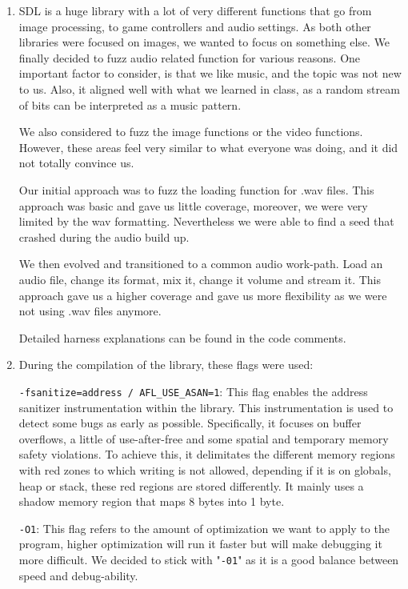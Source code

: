 \documentclass[letterpaper,twocolumn,10pt]{article}
\begin{document}
\begin{enumerate}
    \item SDL is a huge library with a lot of very different functions that go from image processing, to game controllers and audio settings. As both other libraries were focused on images, we wanted to focus on something else. We finally decided to fuzz audio related function for various reasons.
    One important factor to consider, is that we like music, and the topic was not new to us. Also, it aligned well with what we learned in class, as a random stream of bits can be interpreted as a music pattern. 

    We also considered to fuzz the image functions or the video functions. However, these areas feel very similar to what everyone was doing, and it did not totally convince us. 

    Our initial approach was to fuzz the loading function for .wav files. This approach was basic and gave us little coverage, moreover, we were very limited by the wav formatting. Nevertheless we were able to find a seed that crashed during the audio build up. 

    We then evolved and transitioned to a common audio work-path. Load an audio file, change its format, mix it, change it volume and stream it. This approach gave us a higher coverage and gave us more flexibility as we were not using .wav files anymore.

    Detailed harness explanations can be found in the code comments.

    \item During the compilation of the library, these flags were used:

    \texttt{-fsanitize=address / AFL\_USE\_ASAN=1}: This flag enables the address sanitizer instrumentation within the library. This instrumentation is used to detect some bugs as early as possible. Specifically, it focuses on buffer overflows, a little of use-after-free and some spatial and temporary memory safety violations. To achieve this, it delimitates the different memory regions with red zones to which writing is not allowed, depending if it is on globals, heap or stack, these red regions are stored differently. It mainly uses a shadow memory region that maps 8 bytes into 1 byte.

    \texttt{-O1}: This flag refers to the amount of optimization we want to apply to the program, higher optimization will run it faster but will make debugging it more difficult. We decided to stick with "\texttt{-01}" as it is a good balance between speed and debug-ability.


\end{enumerate}
\end{document}
